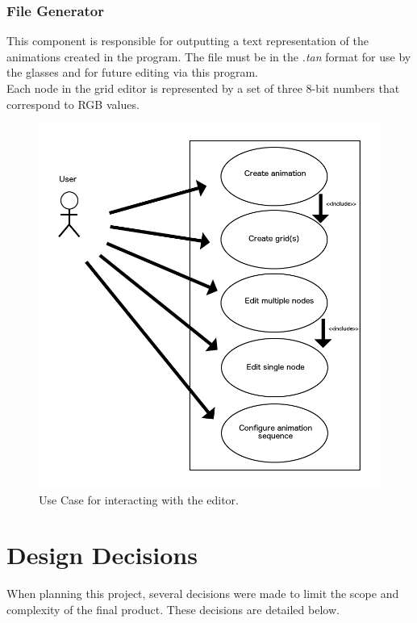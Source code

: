\documentclass[12pt]{article}
\begin{document}
  \subsubsection {File Generator}
    This component is responsible for outputting a text representation of the animations created in the program. The file must be in the \textit{.tan} format for use by the glasses and for future editing via this program.
    \\
    Each node in the grid editor is represented by a set of three 8-bit numbers that correspond to RGB values. 
  
  
  	\begin{figure}[ht!]
  		\centering
  		\includegraphics[width=0.8\linewidth]{Relationship_Use.png}
  		\caption{Use Case for interacting with the editor.}
  	\end{figure}
	\clearpage	
\newpage

	\section{Design Decisions}
    When planning this project, several decisions were made to limit the scope and complexity of the final product. These decisions are detailed below. 
    
\end{document}
